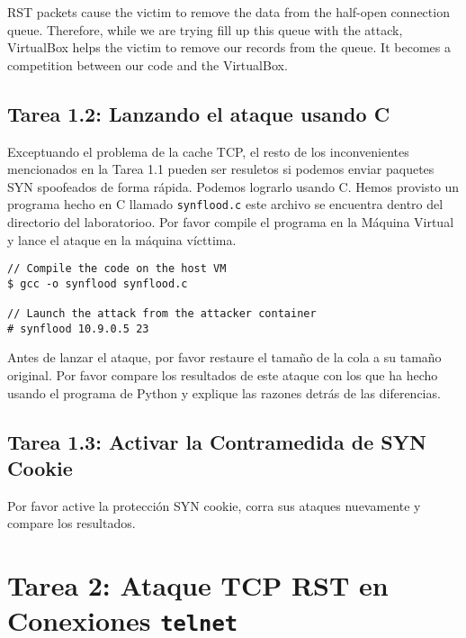 RST packets cause the victim to remove the data from the half-open connection
queue. Therefore, while we are trying fill up this queue with the attack, 
VirtualBox helps the victim to remove our records from the queue. 
It becomes a competition between our code and the VirtualBox. 


\subsection{Tarea 1.2: Lanzando el ataque usando C} 

Exceptuando el problema de la cache TCP, el resto de los inconvenientes mencionados en la Tarea 1.1 pueden ser resuletos si podemos enviar paquetes SYN spoofeados de forma rápida. Podemos lograrlo usando C. Hemos provisto un programa hecho en C llamado \texttt{synflood.c} este archivo se encuentra dentro del directorio del laboratorioo. Por favor compile el programa en la Máquina Virtual y lance el ataque en la máquina vícttima.

\begin{lstlisting}
// Compile the code on the host VM
$ gcc -o synflood synflood.c

// Launch the attack from the attacker container
# synflood 10.9.0.5 23
\end{lstlisting}

Antes de lanzar el ataque, por favor restaure el tamaño de la cola a su tamaño original. Por favor compare los resultados de este ataque con los que ha hecho usando el programa de Python y explique las razones detrás de las diferencias.  

 



\subsection{Tarea 1.3: Activar la Contramedida de SYN Cookie}

Por favor active la protección SYN cookie, corra sus ataques nuevamente y compare los resultados. 



\section {Tarea 2: Ataque TCP RST en Conexiones \texttt{telnet}}

